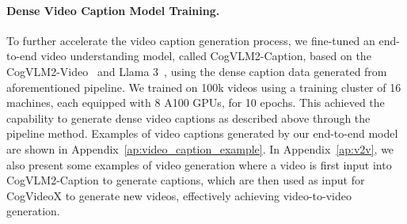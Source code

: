 \paragraph{Dense Video Caption Model Training.} To further accelerate the video caption generation process, we fine-tuned an end-to-end video understanding model, called CogVLM2-Caption, based on the CogVLM2-Video~\citep{CogVLM2-Video} and Llama 3~\citep{llama3modelcard}, using the dense caption data generated from aforementioned pipeline. We trained on 100k videos using a training cluster of 16 machines, each equipped with 8 A100 GPUs, for 10 epochs. This achieved the capability to generate dense video captions as described above through the pipeline method. Examples of video captions generated by our end-to-end model are shown in Appendix~\ref{ap:video_caption_example}. In Appendix~\ref{ap:v2v}, we also present some examples of video generation where a video is first input into CogVLM2-Caption to generate captions, which are then used as input for CogVideoX to generate new videos, effectively achieving video-to-video generation.



